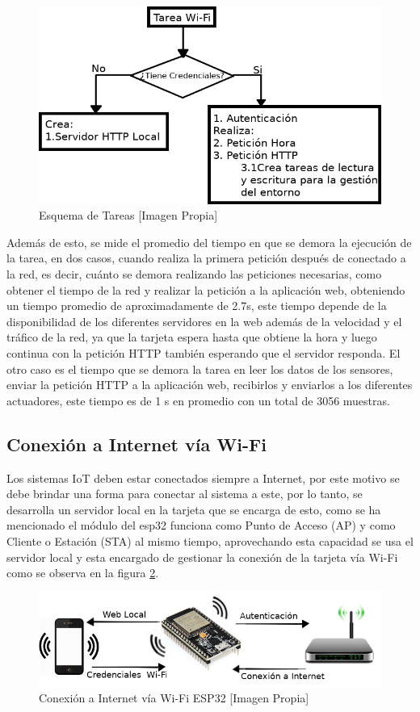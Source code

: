 \begin{figure}[H]
	\centering
	\caption{Esquema de Tareas [Imagen Propia]}
	\label{fig:tareas}
	\includegraphics[width=0.7\linewidth]{Imagenes/tareas}
\end{figure}

Además de esto, se mide el promedio del tiempo en que se demora la ejecución de la tarea, en dos casos, cuando realiza la primera petición después de conectado a la red, es decir, cuánto se demora realizando las peticiones necesarias, como obtener el tiempo de la red y realizar la petición a la aplicación web, obteniendo un tiempo promedio de aproximadamente de 2.7s, este tiempo depende de la disponibilidad de los diferentes servidores en la web además de la velocidad y el tráfico de la red, ya que la tarjeta espera hasta que obtiene la hora y luego continua con la petición HTTP también esperando que el servidor responda. El otro caso es el tiempo que se demora la tarea en leer los datos de los sensores, enviar la petición HTTP a la aplicación web, recibirlos y enviarlos a los diferentes actuadores, este tiempo es de 1 s en promedio con un total de 3056 muestras.

\subsection{Conexión a Internet vía Wi-Fi}\label{sub:wifi}

Los sistemas IoT deben estar conectados siempre a Internet, por este motivo se debe brindar una forma para conectar al sistema a este, por lo tanto, se desarrolla un servidor local en la tarjeta que se encarga de esto, como se ha mencionado el módulo del esp32 funciona como Punto de Acceso (AP) y como Cliente o Estación (STA) al mismo tiempo, aprovechando esta capacidad se usa el servidor local y esta encargado de gestionar la conexión de la tarjeta vía Wi-Fi como se observa en la figura \ref{fig:conexion}.\\

\begin{figure}[H]
	\centering
	\caption{Conexión a Internet vía Wi-Fi ESP32 [Imagen Propia]}
	\label{fig:conexion}
	\includegraphics[width=0.7\linewidth]{Imagenes/conexion}
\end{figure}



